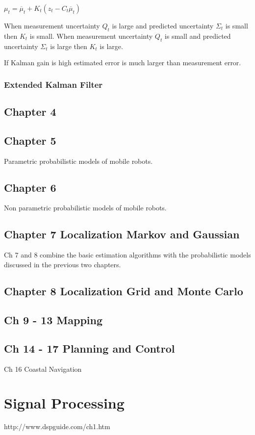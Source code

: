 \documentclass{article}
\begin{document}
$\mu_t = \overline{\mu}_t + K_t ( z_t - C_t \overline{\mu}_t)$ 

When measurement uncertainty $Q_t$ is large and predicted uncertainty $\Sigma_t$ is small then  $K_t$ is small. When measurement uncertainty $Q_t$ is small and predicted uncertainty $\Sigma_t$ is large then $K_t$ is large.




If Kalman gain is high estimated error is much larger than measurement error. 

\subsubsection{Extended Kalman Filter}

\subsection{Chapter 4}
\subsection{Chapter 5}
Parametric probabilistic models of mobile robots.
\subsection{Chapter 6}
Non parametric probabilistic models of mobile robots.
\subsection{Chapter 7 Localization Markov and Gaussian}
Ch 7 and 8 combine the basic estimation algorithms with the probabilistic models discussed in the previous two chapters.
\subsection{Chapter 8 Localization Grid and Monte Carlo}
\subsection{Ch 9 - 13 Mapping}
\subsection{Ch 14 - 17 Planning and Control}
Ch 16 Coastal Navigation

\section{Signal Processing}
http://www.dspguide.com/ch1.htm
\end{document}
